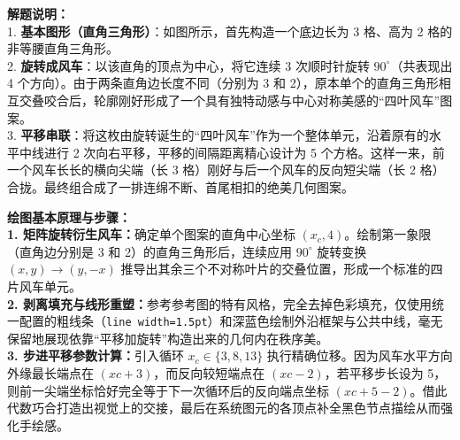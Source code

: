 \vspace{0.6cm}

{\small\color{gray}
\textbf{解题说明：}\\
1. \textbf{基本图形（直角三角形）}：如图所示，首先构造一个底边长为 3 格、高为 2 格的非等腰直角三角形。\\
2. \textbf{旋转成风车}：以该直角的顶点为中心，将它连续 3 次顺时针旋转 $90^\circ$（共表现出 4 个方向）。由于两条直角边长度不同（分别为 3 和 2），原本单个的直角三角形相互交叠咬合后，轮廓刚好形成了一个具有独特动感与中心对称美感的“四叶风车”图案。\\
3. \textbf{平移串联}：将这枚由旋转诞生的“四叶风车”作为一个整体单元，沿着原有的水平中线进行 2 次向右平移，平移的间隔距离精心设计为 5 个方格。这样一来，前一个风车长长的横向尖端（长 3 格）刚好与后一个风车的反向短尖端（长 2 格）合拢。最终组合成了一排连绵不断、首尾相扣的绝美几何图案。
}

\vspace{0.6cm}

{\small\color{blue!70!black}
\textbf{绘图基本原理与步骤：}\\
\textbf{1. 矩阵旋转衍生风车：}确定单个图案的直角中心坐标 $(x_c, 4)$。绘制第一象限（直角边分别是 3 和 2）的直角三角形后，连续应用 $90^\circ$ 旋转变换 $(x,y) \to (y,-x)$ 推导出其余三个不对称叶片的交叠位置，形成一个标准的四片风车单元。\\
\textbf{2. 剥离填充与线形重塑：}参考参考图的特有风格，完全去掉色彩填充，仅使用统一配置的粗线条（\texttt{line width=1.5pt}）和深蓝色绘制外沿框架与公共中线，毫无保留地展现依靠“平移加旋转”构造出来的几何内在秩序美。\\
\textbf{3. 步进平移参数计算：}引入循环 $x_c \in \{3, 8, 13\}$ 执行精确位移。因为风车水平方向外缘最长端点在 $(xc+3)$，而反向较短端点在 $(xc-2)$，若平移步长设为 5，则前一尖端坐标恰好完全等于下一次循环后的反向端点坐标 $(xc+5-2)$。借此代数巧合打造出视觉上的交接，最后在系统图元的各顶点补全黑色节点描绘从而强化手绘感。
}

\newpage
